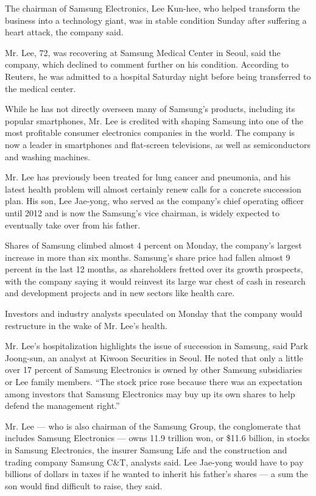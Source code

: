 The chairman of Samsung Electronics, Lee Kun-hee, who helped transform
the business into a technology giant, was in stable condition Sunday
after suffering a heart attack, the company said.

Mr. Lee, 72, was recovering at Samsung Medical Center in Seoul, said the
company, which declined to comment further on his condition. According
to Reuters, he was admitted to a hospital Saturday night before being
transferred to the medical center.

While he has not directly overseen many of Samsung's products, including
its popular smartphones, Mr. Lee is credited with shaping Samsung into
one of the most profitable consumer electronics companies in the world.
The company is now a leader in smartphones and flat-screen televisions,
as well as semiconductors and washing machines.

Mr. Lee has previously been treated for lung cancer and pneumonia, and
his latest health problem will almost certainly renew calls for a
concrete succession plan. His son, Lee Jae-yong, who served as the
company's chief operating officer until 2012 and is now the Samsung's
vice chairman, is widely expected to eventually take over from his
father.

Shares of Samsung climbed almost 4 percent on Monday, the company's
largest increase in more than six months. Samsung's share price had
fallen almost 9 percent in the last 12 months, as shareholders fretted
over its growth prospects, with the company saying it would reinvest its
large war chest of cash in research and development projects and in new
sectors like health care.

Investors and industry analysts speculated on Monday that the company
would restructure in the wake of Mr. Lee's health.

Mr. Lee's hospitalization highlights the issue of succession in Samsung,
said Park Joong-sun, an analyst at Kiwoon Securities in Seoul. He noted
that only a little over 17 percent of Samsung Electronics is owned by
other Samsung subsidiaries or Lee family members. ``The stock price rose
because there was an expectation among investors that Samsung
Electronics may buy up its own shares to help defend the management
right.''

Mr. Lee --- who is also chairman of the Samsung Group, the conglomerate
that includes Samsung Electronics --- owns 11.9 trillion won, or \$11.6
billion, in stocks in Samsung Electronics, the insurer Samsung Life and
the construction and trading company Samsung C\&T, analysts said. Lee
Jae-yong would have to pay billions of dollars in taxes if he wanted to
inherit his father's shares --- a sum the son would find difficult to
raise, they said.

